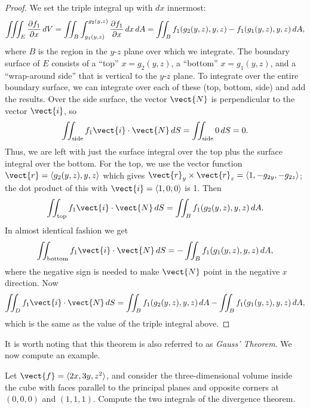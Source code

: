 \begin{proof}
We set the triple integral up with $dx$ innermost:
$$\iiint_{E} {\partial f_1 \over \partial x}\,dV=\iint_{B}\int_{g_1(y,z)}^{g_2(y,z)} {\partial f_1 \over \partial x}\,dx\,dA=
\iint_{B} f_1(g_2(y,z),y,z)-f_1(g_1(y,z),y,z)\,dA,$$
where $B$ is the region in the $y$-$z$ plane over which we integrate.
The boundary surface of $E$ consists of a ``top'' $x=g_2(y,z)$, a
``bottom'' $x=g_1(y,z)$, and a ``wrap-around side'' that is vertical
to the $y$-$z$ plane. To integrate over the entire boundary surface,
we can integrate over each of these (top, bottom, side) and add the
results. Over the side surface, the vector $\vect{N}$ is perpendicular to
the vector $\vect{i}$, so
$$
\iint_{\hbox{\scriptsize side}} f_1\vect{i}\cdot\vect{N}\,dS = 
\iint_{\hbox{\scriptsize side}}
0\,dS=0.$$
Thus, we are left with just the surface integral over the top plus the
surface integral over the bottom. For the top, we use the vector
function
$\vect{r}=\langle g_2(y,z),y,z\rangle$ which gives 
$\vect{r}_y\times\vect{r}_z=\langle 1,-g_{2y},-g_{2z}\rangle$; the dot
product of this with $\vect{i}=\langle 1,0,0\rangle$ is 1. Then
$$
\iint_{\hbox{\scriptsize top}} f_1\vect{i}\cdot\vect{N}\,dS
=\iint_{B} f_1(g_2(y,z),y,z)\,dA.$$
In almost identical fashion we get
$$
\iint_{\hbox{\scriptsize bottom}} f_1\vect{i}\cdot\vect{N}\,dS
=-\iint_{B} f_1(g_1(y,z),y,z)\,dA,$$
where the negative sign is needed to make $\vect{N}$ point in the
negative $x$ direction. Now
$$\iint_{D} f_1\vect{i}\cdot\vect{N}\,dS
=\iint_{B} f_1(g_2(y,z),y,z)\,dA-\iint_{B}
    f_1(g_1(y,z),y,z)\,dA,$$ which is the same as the value of the
    triple integral above.
\end{proof}

It is worth noting that this theorem is also referred to as \textit{Gauss' Theorem}. We now compute an example. 

\begin{example}{}{}
Let $\vect{f}=\langle 2x,3y,z^2\rangle$, and consider the
three-dimensional volume inside the cube with faces parallel to the
principal planes and opposite corners at
$(0,0,0)$ and $(1,1,1)$. Compute the two integrals of the
divergence theorem.
\end{example}

